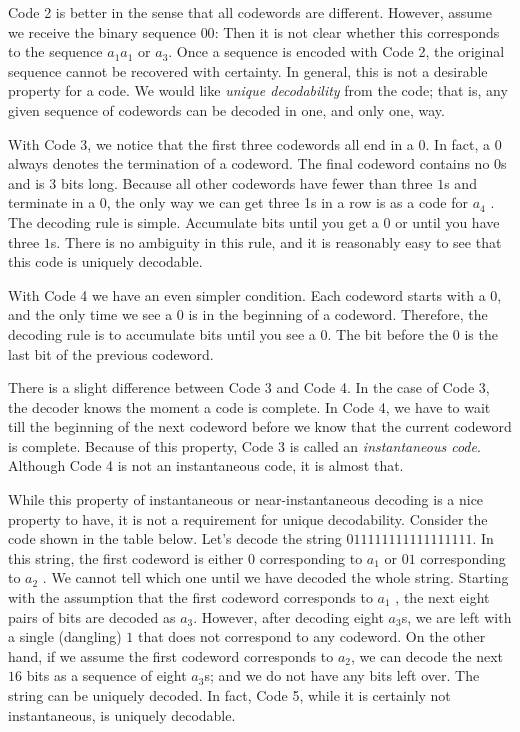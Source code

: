 Code 2 is better in the sense that all codewords are different. However, assume we receive the binary sequence $00$: Then it is not clear whether this corresponds to the sequence $a_1 a_1$ or $a_3$. Once a sequence is encoded with Code 2, the original sequence cannot be recovered with certainty. In general, this is not a desirable property for a code. We would like \emph{unique decodability} from the code; that is, any given sequence of codewords can be decoded in one, and only one, way.

With Code 3, we notice that the first three codewords all end in a $0$. In fact, a $0$ always denotes the termination of a codeword. The final codeword contains no $0$s and is $3$ bits long. Because all other codewords have fewer than three $1$s and terminate in a $0$, the only way we can get three 1s in a row is as a code for $a_4$ . The decoding rule is simple. Accumulate bits until you get a $0$ or until you have three $1$s. There is no ambiguity in this rule, and it is reasonably easy to see that this code is uniquely decodable.

With Code 4 we have an even simpler condition. Each codeword starts with a $0$, and the only time we see a $0$ is in the beginning of a codeword. Therefore, the decoding rule is to accumulate bits until you see a $0$. The bit before the 0 is the last bit of the previous codeword.

There is a slight difference between Code 3 and Code 4. In the case of Code 3, the decoder knows the moment a code is complete. In Code 4, we have to wait till the beginning of the next codeword before we know that the current codeword is complete. Because of this property, Code 3 is called an \emph{instantaneous code}. Although Code 4 is not an instantaneous code, it is almost that.

While this property of instantaneous or near-instantaneous decoding is a nice property to have, it is not a requirement for unique decodability. Consider the code shown in the table below. Let’s decode the string $011111111111111111$. In this string, the first codeword is either $0$ corresponding to $a_1$ or $01$ corresponding to $a_2$ . We cannot tell which one until we have decoded the whole string. Starting with the assumption that the first codeword corresponds to $a_1$ , the next eight pairs of bits are decoded as $a_3$. However, after decoding eight $a_3$s, we are left with a single (dangling) $1$ that does not correspond to any codeword. On the other hand, if we assume the first codeword corresponds to $a_2$, we can decode the next $16$ bits as a sequence of eight $a_3$s; and we do not have any bits left over. The string can be uniquely decoded. In fact, Code 5, while it is certainly not instantaneous, is uniquely decodable.

